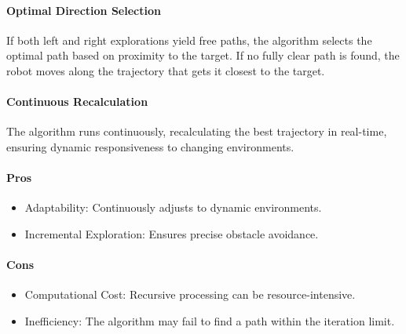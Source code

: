 \paragraph{Optimal Direction Selection}

If both left and right explorations yield free paths, the algorithm selects the optimal path based on proximity to the target. If no fully clear path is found, the robot moves along the trajectory that gets it closest to the target.

\paragraph{Continuous Recalculation}

The algorithm runs continuously, recalculating the best trajectory in real-time, ensuring dynamic responsiveness to changing environments.


\paragraph{Pros}
\begin{itemize}
    \item Adaptability: Continuously adjusts to dynamic environments.
    \item Incremental Exploration: Ensures precise obstacle avoidance.
\end{itemize}

\paragraph{Cons}
\begin{itemize}
    \item Computational Cost: Recursive processing can be resource-intensive.
    \item Inefficiency: The algorithm may fail to find a path within the iteration limit.
\end{itemize}
